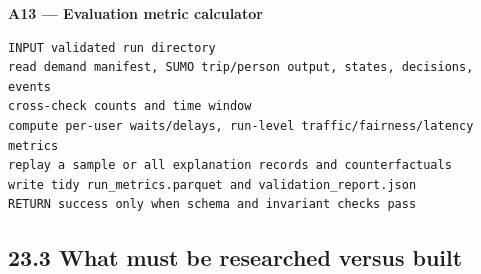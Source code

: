 \documentclass[
  english,
  11pt,
  a4paper,
]{article}
\begin{document}
\textbf{A13 --- Evaluation metric calculator}

\begin{verbatim}
INPUT validated run directory
read demand manifest, SUMO trip/person output, states, decisions, events
cross-check counts and time window
compute per-user waits/delays, run-level traffic/fairness/latency metrics
replay a sample or all explanation records and counterfactuals
write tidy run_metrics.parquet and validation_report.json
RETURN success only when schema and invariant checks pass
\end{verbatim}

\subsection{23.3 What must be researched versus
built}\label{what-must-be-researched-versus-built}
\end{document}
